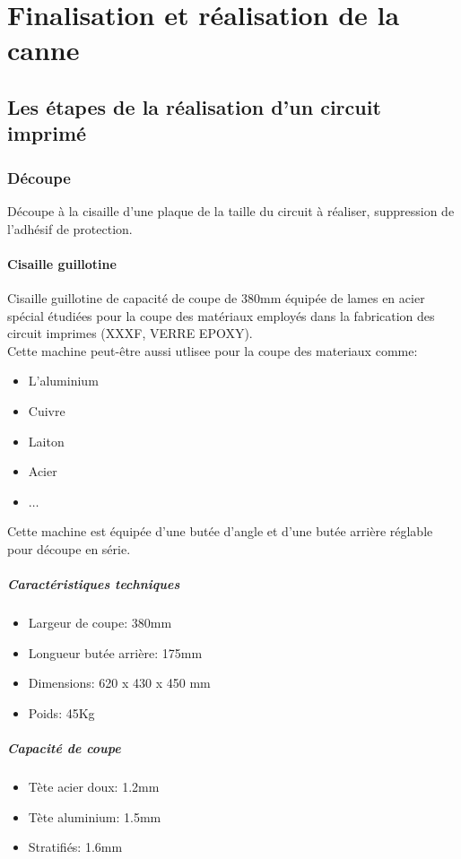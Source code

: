 \chapter{Finalisation et réalisation de la canne}

\section{Les étapes de la réalisation d'un circuit imprimé}
\label{realisation-circuit-imprime}

\subsection{Découpe}
Découpe à la cisaille d'une plaque de la taille du circuit à réaliser, suppression de l'adhésif de protection.

\subsubsection*{Cisaille guillotine}
Cisaille guillotine de capacité de coupe de 380mm équipée de lames en acier spécial étudiées pour la coupe des matériaux employés dans la fabrication des circuit imprimes (XXXF, VERRE EPOXY). \\
Cette machine peut-être aussi utlisee pour la coupe des materiaux comme:
\begin{itemize}
    \item L'aluminium
    \item Cuivre
    \item Laiton
    \item Acier
    \item $\hdots$
\end{itemize}
Cette machine est équipée d'une butée d'angle et d'une butée arrière réglable pour découpe en série.

\paragraph*{Caractéristiques techniques}
\begin{itemize}
    \item Largeur de coupe: 380mm
    \item Longueur butée arrière: 175mm
    \item Dimensions: 620 x 430 x 450 mm
    \item Poids: 45Kg
\end{itemize}

\paragraph*{Capacité de coupe}
\begin{itemize}
    \item Tète acier doux: 1.2mm
    \item Tète aluminium: 1.5mm
    \item Stratifiés: 1.6mm
\end{itemize}


